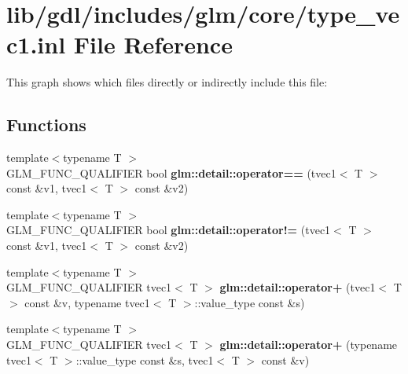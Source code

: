 \hypertarget{type__vec1_8inl}{}\section{lib/gdl/includes/glm/core/type\+\_\+vec1.inl File Reference}
\label{type__vec1_8inl}
This graph shows which files directly or indirectly include this file\+:
\subsection*{Functions}
\begin{DoxyCompactItemize}
\item 
\hypertarget{namespaceglm_1_1detail_a73b150423d0880aaccd2dabbc9008cdb}{}{\footnotesize template$<$typename T $>$ }\\G\+L\+M\+\_\+\+F\+U\+N\+C\+\_\+\+Q\+U\+A\+L\+I\+F\+I\+E\+R bool {\bfseries glm\+::detail\+::operator==} (tvec1$<$ T $>$ const \&v1, tvec1$<$ T $>$ const \&v2)\label{namespaceglm_1_1detail_a73b150423d0880aaccd2dabbc9008cdb}

\item 
\hypertarget{namespaceglm_1_1detail_a611e8f2c930d31e758eaa74fa15c3145}{}{\footnotesize template$<$typename T $>$ }\\G\+L\+M\+\_\+\+F\+U\+N\+C\+\_\+\+Q\+U\+A\+L\+I\+F\+I\+E\+R bool {\bfseries glm\+::detail\+::operator!=} (tvec1$<$ T $>$ const \&v1, tvec1$<$ T $>$ const \&v2)\label{namespaceglm_1_1detail_a611e8f2c930d31e758eaa74fa15c3145}

\item 
\hypertarget{namespaceglm_1_1detail_a2580bdc3b66eee924d83e01e904b1149}{}{\footnotesize template$<$typename T $>$ }\\G\+L\+M\+\_\+\+F\+U\+N\+C\+\_\+\+Q\+U\+A\+L\+I\+F\+I\+E\+R tvec1$<$ T $>$ {\bfseries glm\+::detail\+::operator+} (tvec1$<$ T $>$ const \&v, typename tvec1$<$ T $>$\+::value\+\_\+type const \&s)\label{namespaceglm_1_1detail_a2580bdc3b66eee924d83e01e904b1149}

\item 
\hypertarget{namespaceglm_1_1detail_ad221a83a6f3d41d77f8650043f1ba5ef}{}{\footnotesize template$<$typename T $>$ }\\G\+L\+M\+\_\+\+F\+U\+N\+C\+\_\+\+Q\+U\+A\+L\+I\+F\+I\+E\+R tvec1$<$ T $>$ {\bfseries glm\+::detail\+::operator+} (typename tvec1$<$ T $>$\+::value\+\_\+type const \&s, tvec1$<$ T $>$ const \&v)\label{namespaceglm_1_1detail_ad221a83a6f3d41d77f8650043f1ba5ef}


\end{DoxyCompactItemize}
